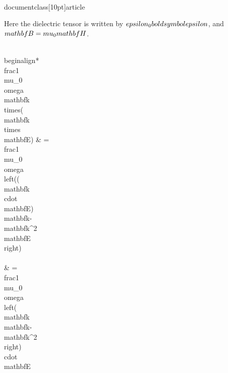 \\documentclass[10pt]{article}
\begin{document}
{{{{Here the dielectric tensor is written by $\\epsilon_{0} \\boldsymbol{\\epsilon}$, and $\\mathbf{B}=\\mu_{0} \\mathbf{H}$.


\\begin{align*}
\\frac{1}{\\mu_{0} \\omega} \\mathbf{k} \\times(\\mathbf{k} \\times \\mathbf{E}) & =\\frac{1}{\\mu_{0} \\omega}\\left((\\mathbf{k} \\cdot \\mathbf{E}) \\mathbf{k}-\\mathbf{k}^{2} \\mathbf{E}\\right) \\\\
& =\\frac{1}{\\mu_{0} \\omega}\\left(\\mathbf{k} \\mathbf{k}-\\mathbf{k}^{2}\\right) \\cdot \\mathbf{E} \\\\
}}}}
\end{document}
